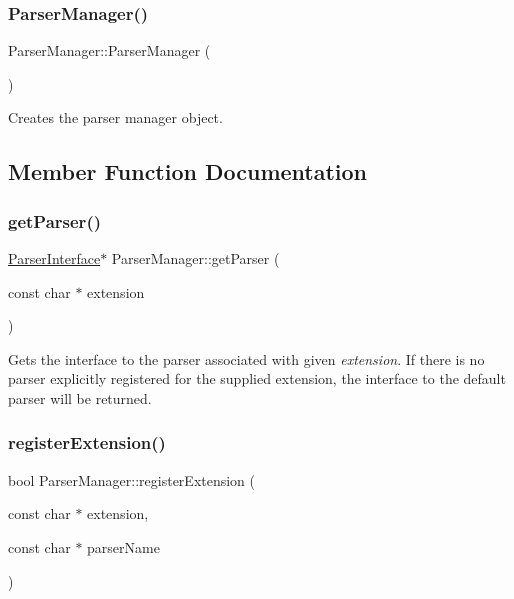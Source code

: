 \subsubsection{\texorpdfstring{ParserManager()}{ParserManager()}}
{\footnotesize\ttfamily Parser\+Manager\+::\+Parser\+Manager (\begin{DoxyParamCaption}{ }\end{DoxyParamCaption})\hspace{0.3cm}{\ttfamily [inline]}}

Creates the parser manager object. 

\subsection{Member Function Documentation}
\mbox{\label{class_parser_manager_a69f9874c260df7559242ec5833051ac5}} 
\subsubsection{\texorpdfstring{getParser()}{getParser()}}
{\footnotesize\ttfamily \mbox{\hyperlink{class_parser_interface}{Parser\+Interface}}$\ast$ Parser\+Manager\+::get\+Parser (\begin{DoxyParamCaption}\item[{const char $\ast$}]{extension }\end{DoxyParamCaption})\hspace{0.3cm}{\ttfamily [inline]}}

Gets the interface to the parser associated with given {\itshape extension}. If there is no parser explicitly registered for the supplied extension, the interface to the default parser will be returned. \mbox{\label{class_parser_manager_a2184813c0cd50eda1cf6ce74bf50d8b5}} 
\subsubsection{\texorpdfstring{registerExtension()}{registerExtension()}}
{\footnotesize\ttfamily bool Parser\+Manager\+::register\+Extension (\begin{DoxyParamCaption}\item[{const char $\ast$}]{extension,  }\item[{const char $\ast$}]{parser\+Name }\end{DoxyParamCaption})\hspace{0.3cm}{\ttfamily [inline]}}

